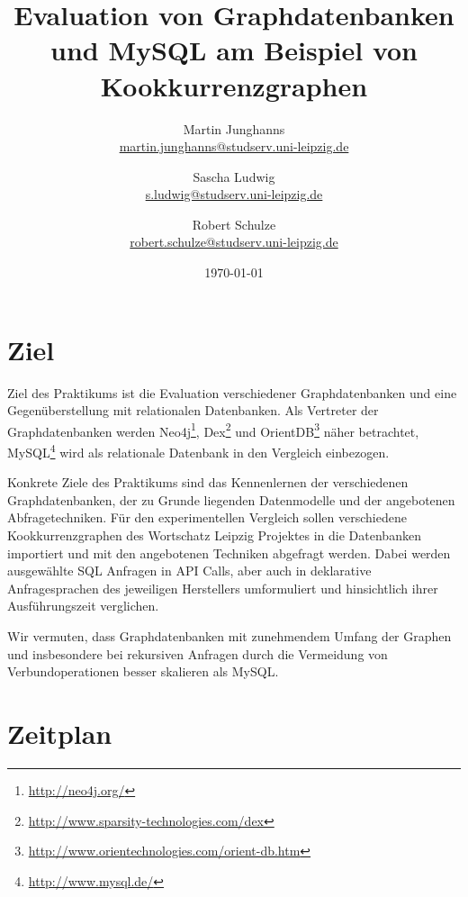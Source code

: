 \documentclass[11pt, a4paper, ngerman, oneside]{article} %
\author{Martin Junghanns \\  \url{martin.junghanns@studserv.uni-leipzig.de} \and 
		Sascha Ludwig \\ \url{s.ludwig@studserv.uni-leipzig.de} \and 
		Robert Schulze \\ \url{robert.schulze@studserv.uni-leipzig.de} }
\date{\today}
\title{Evaluation von Graphdatenbanken und MySQL am Beispiel von Kookkurrenzgraphen }
\begin{document}
\renewcommand{\labelitemi}{-}

\maketitle


\section{Ziel}

Ziel des Praktikums ist die Evaluation verschiedener Graphdatenbanken und eine Gegenüberstellung mit relationalen Datenbanken. Als Vertreter der Graphdatenbanken werden Neo4j\footnote{\url{http://neo4j.org/}}, Dex\footnote{\url{http://www.sparsity-technologies.com/dex}} und OrientDB\footnote{\url{http://www.orientechnologies.com/orient-db.htm}} näher betrachtet, MySQL\footnote{\url{http://www.mysql.de/}} wird als relationale Datenbank in den Vergleich einbezogen.
\par
Konkrete Ziele des Praktikums sind das Kennenlernen der verschiedenen Graphdatenbanken, der zu Grunde liegenden Datenmodelle und der angebotenen Abfragetechniken. Für den experimentellen Vergleich sollen verschiedene Kookkurrenzgraphen des Wortschatz Leipzig Projektes in die Datenbanken importiert und mit den angebotenen Techniken abgefragt werden. Dabei werden ausgewählte SQL Anfragen in API Calls, aber auch in deklarative Anfragesprachen des jeweiligen Herstellers umformuliert und hinsichtlich ihrer Ausführungszeit verglichen.\\
\par
Wir vermuten, dass Graphdatenbanken mit zunehmendem Umfang der Graphen und insbesondere bei rekursiven Anfragen durch die Vermeidung von Verbundoperationen besser skalieren als MySQL.

\newpage

\section{Zeitplan}

\setlength{\tabcolsep}{10pt}		%
\renewcommand{\arraystretch}{1.5}	%
\end{document}
